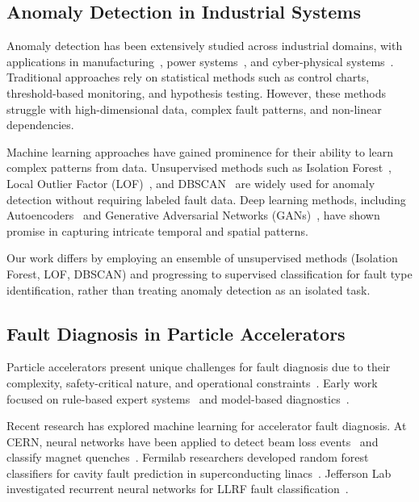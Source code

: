 
\label{sec:related_work}

\subsection{Anomaly Detection in Industrial Systems}

Anomaly detection has been extensively studied across industrial domains, with applications in manufacturing~\cite{MAO2025118377}, power systems~\cite{al2024anomaly}, and cyber-physical systems~\cite{vm2025ai}. Traditional approaches rely on statistical methods such as control charts, threshold-based monitoring, and hypothesis testing. However, these methods struggle with high-dimensional data, complex fault patterns, and non-linear dependencies.

Machine learning approaches have gained prominence for their ability to learn complex patterns from data. Unsupervised methods such as Isolation Forest~\cite{isolation_forest}, Local Outlier Factor (LOF)~\cite{lof}, and DBSCAN~\cite{dbscan} are widely used for anomaly detection without requiring labeled fault data. Deep learning methods, including Autoencoders~\cite{autoencoder_anomaly} and Generative Adversarial Networks (GANs)~\cite{gan_anomaly}, have shown promise in capturing intricate temporal and spatial patterns.

Our work differs by employing an ensemble of unsupervised methods (Isolation Forest, LOF, DBSCAN) and progressing to supervised classification for fault type identification, rather than treating anomaly detection as an isolated task.

\subsection{Fault Diagnosis in Particle Accelerators}

Particle accelerators present unique challenges for fault diagnosis due to their complexity, safety-critical nature, and operational constraints~\cite{accelerator_ml_review, ghribi2025artificial}. Early work focused on rule-based expert systems~\cite{malandain1987} and model-based diagnostics~\cite{sayyar2010optimal}.

Recent research has explored machine learning for accelerator fault diagnosis. At CERN, neural networks have been applied to detect beam loss events~\cite{valentino2018} and classify magnet quenches~\cite{mertik2016}. Fermilab researchers developed random forest classifiers for cavity fault prediction in superconducting linacs~\cite{peters2021}. Jefferson Lab investigated recurrent neural networks for LLRF fault classification~\cite{tennant2020}.

